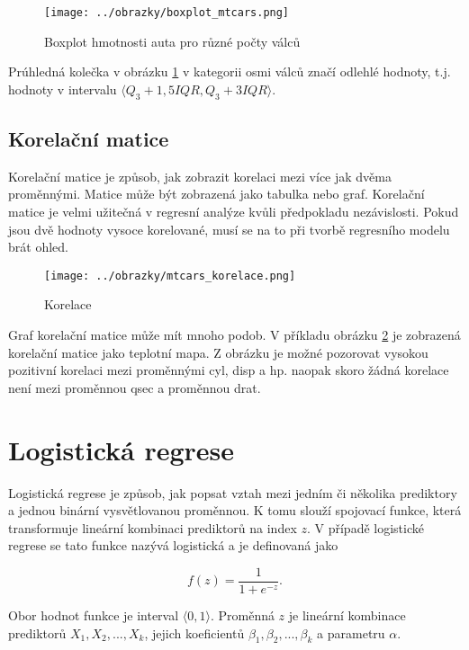 \begin{figure}[H]
    \centering
    \texttt{[image: ../obrazky/boxplot\_mtcars.png]}
    \caption{Boxplot hmotnosti auta pro různé počty válců} 
    \label{fig:boxplot_mtcars}
\end{figure}

Prúhledná kolečka v obrázku \ref{fig:boxplot_mtcars} v kategorii osmi válců značí odlehlé hodnoty, t.j. hodnoty
v intervalu $\langle Q_3 + 1,5IQR, Q_3 + 3IQR \rangle$.

{\color{red}
\subsection{Korelační matice}
Korelační matice je způsob, jak zobrazit korelaci mezi více jak dvěma proměnnými. Matice může být zobrazená jako tabulka nebo
graf. Korelační matice je velmi užitečná v regresní analýze kvůli předpokladu nezávislosti. Pokud jsou dvě hodnoty vysoce korelované,
musí se na to při tvorbě regresního modelu brát ohled.

\begin{figure}[H]
    \centering
    \texttt{[image: ../obrazky/mtcars\_korelace.png]}
    \caption{Korelace} 
    \label{fig:mtcars_korelace}
\end{figure}

Graf korelační matice může mít mnoho podob. V příkladu obrázku \ref{fig:mtcars_korelace} je zobrazená korelační matice jako teplotní mapa. Z obrázku je možné pozorovat vysokou
pozitivní korelaci mezi proměnnými cyl, disp a hp. naopak skoro žádná korelace není mezi proměnnou qsec a proměnnou drat.
}

\newpage
\section{Logistická regrese}
Logistická regrese je způsob, jak popsat vztah mezi jedním či několika prediktory a jednou binární vysvětlovanou 
proměnnou. K tomu slouží spojovací funkce, která transformuje lineární kombinaci prediktorů na index $z$. V případě
logistické regrese se tato funkce nazývá logistická a je definovaná jako

\begin{equation}
    \label{eq:logisticka_funkce}
    f(z) = \frac{1}{1 + e^{-z}}.
\end{equation}

Obor hodnot funkce je interval $\langle 0, 1 \rangle$. Proměnná $z$ je lineární kombinace prediktorů  $X_1, X_2, ..., X_k$, 
jejich koeficientů $\beta_1, \beta_2, ..., \beta_k$ a parametru $\alpha$.

